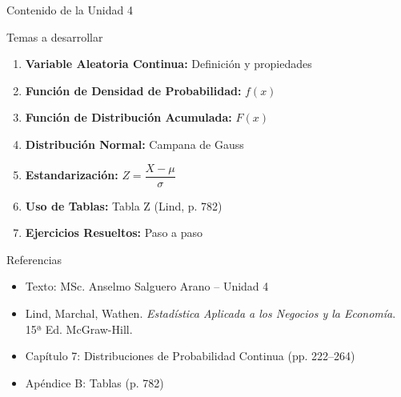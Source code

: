 \documentclass[10pt]{beamer}
\begin{document}
\begin{frame}{Contenido de la Unidad 4}
\begin{block}{Temas a desarrollar}
\begin{enumerate}
  \item \textbf{Variable Aleatoria Continua:} Definición y propiedades
  \item \textbf{Función de Densidad de Probabilidad:} $f(x)$
  \item \textbf{Función de Distribución Acumulada:} $F(x)$
  \item \textbf{Distribución Normal:} Campana de Gauss
  \item \textbf{Estandarización:} $Z = \dfrac{X - \mu}{\sigma}$
  \item \textbf{Uso de Tablas:} Tabla Z (Lind, p. 782)
  \item \textbf{Ejercicios Resueltos:} Paso a paso
\end{enumerate}
\end{block}

\begin{exampleblock}{Referencias}
\begin{itemize}
  \item Texto: MSc. Anselmo Salguero Arano -- Unidad 4
  \item Lind, Marchal, Wathen. \textit{Estadística Aplicada a los Negocios y la Economía}. 15ª Ed. McGraw-Hill.
  \item Capítulo 7: Distribuciones de Probabilidad Continua (pp. 222--264)
  \item Apéndice B: Tablas (p. 782)
\end{itemize}
\end{exampleblock}
\end{frame}
\end{document}
